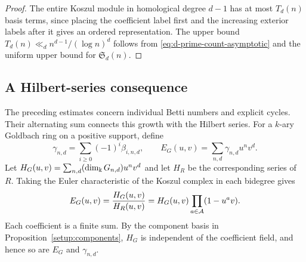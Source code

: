\begin{proof}
The entire Koszul module in homological degree $d-1$ has at most $T_d(n)$
basis terms, since placing the coefficient label first and the
increasing exterior labels after it gives an ordered representation.
The upper bound $T_d(n)\ll_d n^{d-1}/(\log n)^d$ follows from
\eqref{eq:d-prime-count-asymptotic} and the uniform upper bound for
$\mathfrak S_d(n)$.
\end{proof}

\subsection{A Hilbert-series consequence}
\label{sec:hilbert-euler-consequence}
The preceding estimates concern individual Betti numbers and explicit
cycles. Their alternating sum connects this growth with the Hilbert
series. For a $k$-ary Goldbach ring on a positive support, define
\[
 \gamma_{n,d}=\sum_{i\ge0}(-1)^i\beta_{i,n,d},\qquad
 E_G(u,v)=\sum_{n,d}\gamma_{n,d}u^nv^d.
\]
Let $H_G(u,v)=\sum_{n,d}(\dim_\Bbbk G_{n,d})u^nv^d$ and let $H_R$
be the corresponding series of $R$. Taking the Euler characteristic
of the Koszul complex in each bidegree gives
\begin{equation}\label{eq:betti-euler-hilbert}
 E_G(u,v)=\frac{H_G(u,v)}{H_R(u,v)}
        =H_G(u,v)\prod_{a\in\mathcal A}(1-u^av).
\end{equation}
Each coefficient is a finite sum. By the component basis in
Proposition~\ref{setup:components}, $H_G$ is independent of the
coefficient field, and hence so are $E_G$ and $\gamma_{n,d}$.

